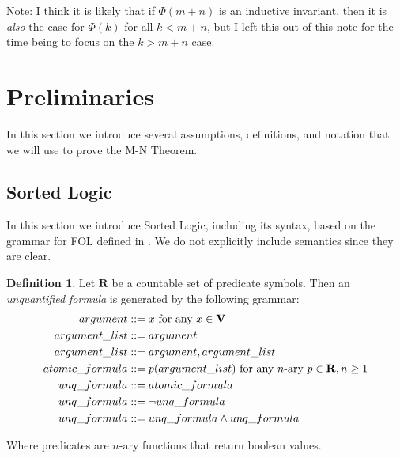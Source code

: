 \documentclass[12pt]{article}
\theoremstyle{definition}
\newtheorem{definition}{Definition}
\theoremstyle{remark}
\begin{document}
Note: I think it is likely that if $\Phi(m+n)$ is an inductive invariant, then it is \textit{also} the case for $\Phi(k)$ for all $k<m+n$, but I left this out of this note for the time being to focus on the $k>m+n$ case.



\section{Preliminaries}
In this section we introduce several assumptions, definitions, and notation that we will use to prove the M-N Theorem.


\subsection{Sorted Logic}
In this section we introduce Sorted Logic, including its syntax, based on the grammar for FOL defined in \cite{ben-ari}.  We do not explicitly include semantics since they are clear.

\begin{definition}
  Let $\mathbf{R}$ be a countable set of predicate symbols.  Then an \textit{unquantified formula} is generated by the following grammar:
  \begin{align*}
    argument &::= x \hfill \text{ for any } x \in \mathbf{V}\\
    argument\_list &::= argument\\
    argument\_list &::= argument,argument\_list\\
    atomic\_formula &::= p(argument\_list) \hfill \text{ for any } n\text{-ary } p \in \mathbf{R}, n \geq 1\\
    unq\_formula &::= atomic\_formula\\
    unq\_formula &::= \neg unq\_formula\\
    unq\_formula &::= unq\_formula \land unq\_formula\\
  \end{align*}

  Where predicates are $n$-ary functions that return boolean values.
\end{definition}
\end{document}
